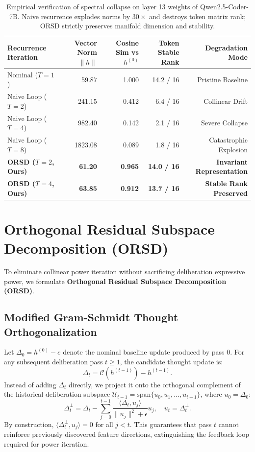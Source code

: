 \documentclass[11pt,a4paper]{article}
\theoremstyle{plain}
\theoremstyle{definition}
\theoremstyle{remark}
\begin{document}
\begin{table}[t]
\centering
\small
\begin{tabular}{lrrrr}
\toprule
\textbf{Recurrence Iteration} & \textbf{Vector Norm $\|h\|$} & \textbf{Cosine Sim vs $h^{(0)}$} & \textbf{Token Stable Rank} & \textbf{Degradation Mode} \\
\midrule
Nominal ($T=1$) & 59.87 & 1.000 & 14.2 / 16 & Pristine Baseline \\
Naive Loop ($T=2$) & 241.15 & 0.412 & 6.4 / 16 & Collinear Drift \\
Naive Loop ($T=4$) & 982.40 & 0.142 & 2.1 / 16 & Severe Collapse \\
Naive Loop ($T=8$) & 1823.08 & 0.089 & 1.8 / 16 & Catastrophic Explosion \\
\midrule
\textbf{ORSD ($T=2$, Ours)} & \textbf{61.20} & \textbf{0.965} & \textbf{14.0 / 16} & \textbf{Invariant Representation} \\
\textbf{ORSD ($T=4$, Ours)} & \textbf{63.85} & \textbf{0.912} & \textbf{13.7 / 16} & \textbf{Stable Rank Preserved} \\
\bottomrule
\end{tabular}
\caption{Empirical verification of spectral collapse on layer 13 weights of Qwen2.5-Coder-7B. Naive recurrence explodes norms by $30\times$ and destroys token matrix rank; ORSD strictly preserves manifold dimension and stability.}
\label{tab:svd_audit}
\end{table}

\section{Orthogonal Residual Subspace Decomposition (ORSD)}

To eliminate collinear power iteration without sacrificing deliberation expressive power, we formulate \textbf{Orthogonal Residual Subspace Decomposition (ORSD)}.

\subsection{Modified Gram-Schmidt Thought Orthogonalization}
Let $\Delta_0 = h^{(0)} - e$ denote the nominal baseline update produced by pass 0. For any subsequent deliberation pass $t \ge 1$, the candidate thought update is:
\begin{equation}
    \Delta_t = \mathcal{C}(h^{(t-1)}) - h^{(t-1)}.
\end{equation}
Instead of adding $\Delta_t$ directly, we project it onto the orthogonal complement of the historical deliberation subspace $\mathcal{U}_{t-1} = \text{span}\{u_0, u_1, \dots, u_{t-1}\}$, where $u_0 = \Delta_0$:
\begin{equation}
    \Delta_t^\perp = \Delta_t - \sum_{j=0}^{t-1} \frac{\langle \Delta_t, u_j \rangle}{\|u_j\|^2 + \epsilon} u_j, \quad u_t = \Delta_t^\perp.
\end{equation}
By construction, $\langle \Delta_t^\perp, u_j \rangle = 0$ for all $j < t$. This guarantees that pass $t$ cannot reinforce previously discovered feature directions, extinguishing the feedback loop required for power iteration.
\end{document}
